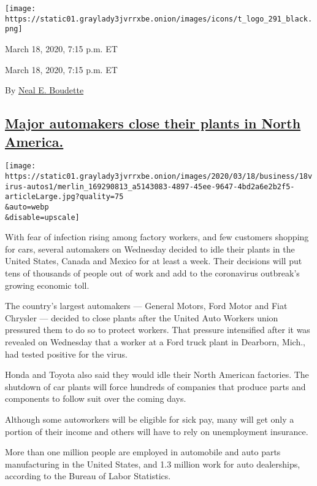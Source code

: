 \texttt{[image: https://static01.graylady3jvrrxbe.onion/images/icons/t\_logo\_291\_black.png]}

March 18, 2020, 7:15 p.m. ET

March 18, 2020, 7:15 p.m. ET

By \href{https://www.nytimes3xbfgragh.onion/by/neal-e-boudette}{Neal E.
Boudette}

\hypertarget{major-automakers-close-their-plants-in-north-america}{%
\subsection{\texorpdfstring{\protect\hyperlink{major-automakers-close-their-plants-in-north-america}{Major
automakers close their plants in North
America.}}{Major automakers close their plants in North America.}}\label{major-automakers-close-their-plants-in-north-america}}

\texttt{[image: https://static01.graylady3jvrrxbe.onion/images/2020/03/18/business/18virus-autos1/merlin\_169290813\_a5143083-4897-45ee-9647-4bd2a6e2b2f5-articleLarge.jpg?quality=75\\\&auto=webp\\\&disable=upscale]}

With fear of infection rising among factory workers, and few customers
shopping for cars, several automakers on Wednesday decided to idle their
plants in the United States, Canada and Mexico for at least a week.
Their decisions will put tens of thousands of people out of work and add
to the coronavirus outbreak's growing economic toll.

The country's largest automakers --- General Motors, Ford Motor and Fiat
Chrysler --- decided to close plants after the United Auto Workers union
pressured them to do so to protect workers. That pressure intensified
after it was revealed on Wednesday that a worker at a Ford truck plant
in Dearborn, Mich., had tested positive for the virus.

Honda and Toyota also said they would idle their North American
factories. The shutdown of car plants will force hundreds of companies
that produce parts and components to follow suit over the coming days.

Although some autoworkers will be eligible for sick pay, many will get
only a portion of their income and others will have to rely on
unemployment insurance.

More than one million people are employed in automobile and auto parts
manufacturing in the United States, and 1.3 million work for auto
dealerships, according to the Bureau of Labor Statistics.

